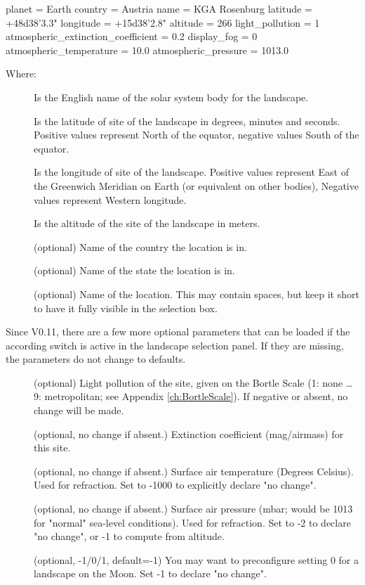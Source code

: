 \begin{configfile}
[location]
planet = Earth
country = Austria
name = KGA Rosenburg
latitude = +48d38'3.3"
longitude = +15d38'2.8"
altitude = 266
light_pollution = 1
atmospheric_extinction_coefficient = 0.2
display_fog = 0
atmospheric_temperature = 10.0
atmospheric_pressure = 1013.0
\end{configfile}
%
Where:
\begin{description}
\item[] Is the English name of the solar system body for
  the landscape.
\item[] Is the latitude of site of the landscape in
  degrees, minutes and seconds. Positive values represent North of the
  equator, negative values South of the equator.
\item[] Is the longitude of site of the
  landscape. Positive values represent East of the Greenwich Meridian
  on Earth (or equivalent on other bodies), Negative values represent
  Western longitude.
\item[] Is the altitude of the site of the landscape in meters.
\item[] (optional) Name of the country the location is in.
\item[] (optional) Name of the state the location is in.
\item[] (optional) Name of the location. This may contain
  spaces, but keep it short to have it fully visible in the
  selection box.
\end{description}
%
Since V0.11, there are a few more optional parameters that can be
loaded if the according switch is active in the landscape selection
panel. If they are missing, the parameters do not change to defaults.

\begin{description}
\item[] (optional) Light pollution of the site,
  given on the Bortle Scale (1: none \ldots 9: metropolitan; see
  Appendix \ref{ch:BortleScale}). If negative or absent, no change
  will be made.
\item[] (optional, no change
  if absent.) Extinction coefficient (mag/airmass) for this site.
\item[] (optional, no change if absent.)
  Surface air temperature (Degrees Celsius). Used for refraction. Set
  to -1000 to explicitly declare "no change".
\item[] (optional, no change if absent.)
  Surface air pressure (mbar; would be 1013 for "normal" sea-level
  conditions). Used for refraction. Set to -2 to declare "no change",
  or -1 to compute from altitude.
\item[] (optional, -1/0/1, default=-1) You may want
  to preconfigure setting 0 for a landscape on the Moon. Set -1 to
  declare "no change".
\end{description}


